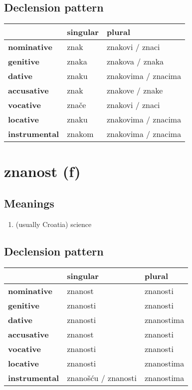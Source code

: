 \subsection*{Declension pattern}
\begin{tabularx}{\linewidth}{Xll}
\toprule
{} & singular &               plural \\
\midrule
\textbf{nominative  } &     znak &      znakovi / znaci \\
\textbf{genitive    } &    znaka &      znakova / znaka \\
\textbf{dative      } &    znaku &  znakovima / znacima \\
\textbf{accusative  } &     znak &      znakove / znake \\
\textbf{vocative    } &    znače &      znakovi / znaci \\
\textbf{locative    } &    znaku &  znakovima / znacima \\
\textbf{instrumental} &   znakom &  znakovima / znacima \\
\bottomrule
\end{tabularx}

\filbreak
\section{znanost (f)}
\subsection*{Meanings}
\begin{enumerate}
\item (usually Croatia) science
\end{enumerate}
\subsection*{Declension pattern}
\begin{tabularx}{\linewidth}{Xll}
\toprule
{} &             singular &      plural \\
\midrule
\textbf{nominative  } &              znanost &    znanosti \\
\textbf{genitive    } &             znanosti &    znanosti \\
\textbf{dative      } &             znanosti &  znanostima \\
\textbf{accusative  } &              znanost &    znanosti \\
\textbf{vocative    } &             znanosti &    znanosti \\
\textbf{locative    } &             znanosti &  znanostima \\
\textbf{instrumental} &  znanošću / znanosti &  znanostima \\
\bottomrule
\end{tabularx}

